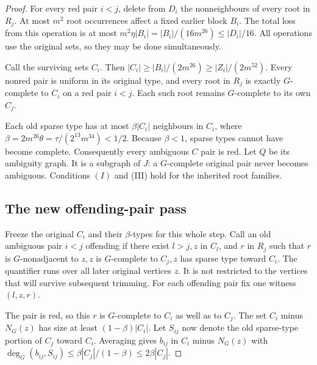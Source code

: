 \documentclass[11pt,a4paper]{article}
\theoremstyle{definition}
\theoremstyle{remark}
\numberwithin{equation}{section}
\begin{document}
\begin{proof}
For every red pair \(i<j\), delete from \(D_{i}\) the nonneighbours of every root in \(R_{j}\). At most \(m^{2}\) root occurrences affect a fixed earlier block \(B_{i}\). The total loss from this operation is at most \(m^{2} \eta |B_{i}| = |B_{i}|/(16m^{26}) \le\allowbreak  |D_{i}|/16\). All operations use the original sets, so they may be done simultaneously.

Call the surviving sets \(C_{i}\). Then \(|C_{i}| \ge\allowbreak  |B_{i}|/(2m^{26}) \ge\allowbreak  |Z_{i}|/(2m^{52})\). Every nonred pair is uniform in its original type, and every root in \(R_{j}\) is exactly \(G\)-complete to \(C_{i}\) on a red pair \(i<j\). Each such root remains \(G\)-complete to its own \(C_{j}\).

Each old sparse type has at most \(\beta |C_{i}|\) neighbours in \(C_{i}\), where \(\beta = 2m^{26} \theta = \tau/(2^{13} m^{34}) < 1/2\). Because \(\beta<1\), sparse types cannot have become complete. Consequently every ambiguous \(C\) pair is red. Let \(Q\) be its ambiguity graph. It is a subgraph of \(J\): a \(G\)-complete original pair never becomes ambiguous. Conditions \((I)\) and (III) hold for the inherited root families.


\subsection{The new offending-pair pass}\label{subsec:rp6-offending}
Freeze the original \(C_{i}\) and their \(\beta\)-types for this whole step. Call an old ambiguous pair \(i<j\) offending if there exist \(l>j,\allowbreak  z\) in \(C_{l}\), and \(r\) in \(R_{j}\) such that \(r\) is \(G\)-nonadjacent to \(z,\allowbreak  z\) is \(G\)-complete to \(C_{j},\allowbreak  z\) has sparse type toward \(C_{i}\). The quantifier runs over all later original vertices \(z\). It is not restricted to the vertices that will survive subsequent trimming. For each offending pair fix one witness \((l,\allowbreak z,\allowbreak r)\).

The pair is red, so this \(r\) is \(G\)-complete to \(C_{i}\) as well as to \(C_{j}\). The set \(C_{i}\) minus \(N_{G}(z)\) has size at least \((1-\beta)|C_{i}|\). Let \(S_{ij}\) now denote the old sparse-type portion of \(C_{j}\) toward \(C_{i}\). Averaging gives \(b_{ij}\) in \(C_{i}\) minus \(N_{G}(z)\) with \(\deg _{G}(b_{ij},\allowbreak S_{ij}) \le\allowbreak  \beta |C_{j}|/(1-\beta) \le\allowbreak  2 \beta |C_{j}|\).


\end{proof}
\end{document}
